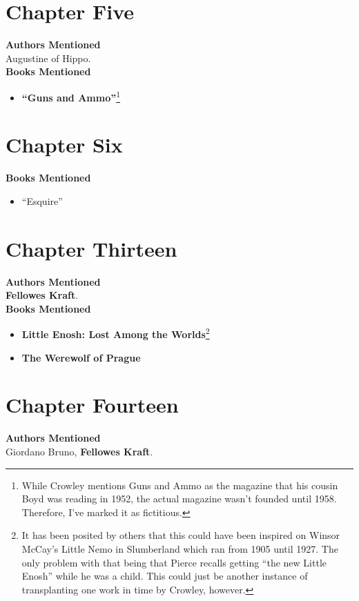 \documentclass[twoside,10pt]{report}
\begin{document}
\section{Chapter Five}
\textbf{Authors Mentioned}\\
Augustine of Hippo.
\\

\textbf{Books Mentioned}
\begin{itemize}
\item \textbf{“Guns and Ammo”}\footnote{While Crowley mentions Guns and Ammo as the magazine that his cousin Boyd was reading in 1952, the actual magazine wasn’t founded until 1958. Therefore, I’ve marked it as fictitious.} \cite{gunsnammo}
\end{itemize}

\section{Chapter Six}
\textbf{Books Mentioned}
\begin{itemize}
\item “Esquire” \cite{esquire}
\end{itemize}

\section{Chapter Thirteen}
\textbf{Authors Mentioned}\\
\textbf{Fellowes Kraft}.
\\

\textbf{Books Mentioned}
\begin{itemize}
\item \textbf{Little Enosh: Lost Among the Worlds}\footnote{It has been posited by others that this could have been inspired on Winsor McCay’s Little Nemo in Slumberland which ran from 1905 until 1927. The only problem with that being that Pierce recalls getting “the new Little Enosh” while he was a child. This could just be another instance of transplanting one work in time by Crowley, however.} \cite{enosh}
\item \textbf{The Werewolf of Prague} \cite{CraftW1}
\end{itemize}


\section{Chapter Fourteen}
\textbf{Authors Mentioned}\\
Giordano Bruno, \textbf{Fellowes Kraft}.
\\
\end{document}
